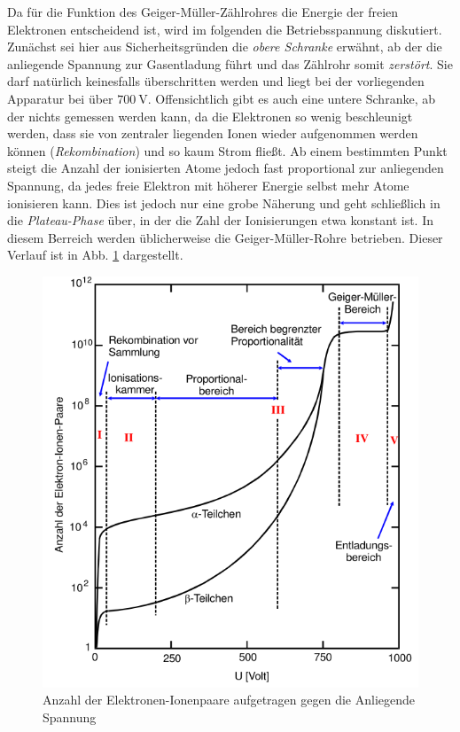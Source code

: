 Da für die Funktion des Geiger-Müller-Zählrohres die Energie der freien Elektronen entscheidend ist, wird im folgenden die Betriebsspannung diskutiert. Zunächst sei hier aus Sicherheitsgründen die \textit{obere Schranke} erwähnt, ab der die anliegende Spannung zur Gasentladung führt und das Zählrohr somit \textit{zerstört}. Sie darf natürlich keinesfalls überschritten werden und liegt bei der vorliegenden Apparatur bei über $\SI{700}{\volt}$. Offensichtlich gibt es auch eine untere Schranke, ab der nichts gemessen werden kann, da die Elektronen so wenig beschleunigt werden, dass sie von zentraler liegenden Ionen wieder aufgenommen werden können (\textit{Rekombination}) und so kaum Strom fließt. Ab einem bestimmten Punkt steigt die Anzahl der ionisierten Atome jedoch fast proportional zur anliegenden Spannung, da jedes freie Elektron mit höherer Energie selbst mehr Atome ionisieren kann. Dies ist jedoch nur eine grobe Näherung und geht schließlich in die \textit{Plateau-Phase} über, in der die Zahl der Ionisierungen etwa konstant ist. In diesem Berreich werden üblicherweise die Geiger-Müller-Rohre betrieben. Dieser Verlauf ist in Abb. \ref{fig:GM-Kurve} dargestellt.

\begin{figure}
  \centering
  \includegraphics[width = \textwidth]{./logos/GM-Kurve.PNG}
  \caption{Anzahl der Elektronen-Ionenpaare aufgetragen gegen die Anliegende Spannung \cite{Anleitung}}
  \label{fig:GM-Kurve}
\end{figure}

